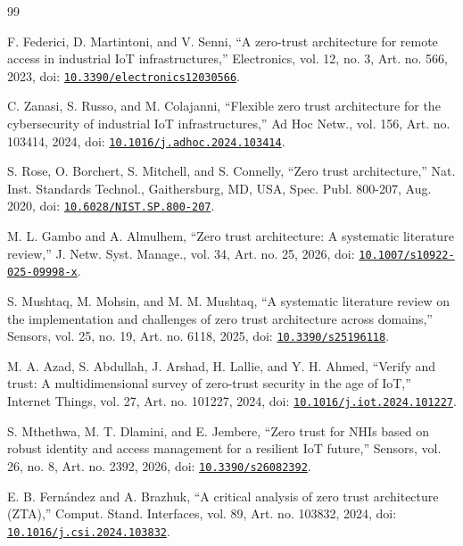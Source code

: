 \documentclass[a4paper,5p,times,twocolumn,number,sort&compress]{elsarticle}
\begin{document}
\begin{thebibliography}{99}
\footnotesize\raggedright\setlength{\itemsep}{0pt}\sloppy

 F. Federici, D. Martintoni, and V. Senni, ``A zero-trust architecture for remote access in industrial IoT infrastructures,'' Electronics, vol. 12, no. 3, Art. no. 566, 2023, doi: \href{https://doi.org/10.3390/electronics12030566}{\nolinkurl{10.3390/electronics12030566}}.

 C. Zanasi, S. Russo, and M. Colajanni, ``Flexible zero trust architecture for the cybersecurity of industrial IoT infrastructures,'' Ad Hoc Netw., vol. 156, Art. no. 103414, 2024, doi: \href{https://doi.org/10.1016/j.adhoc.2024.103414}{\nolinkurl{10.1016/j.adhoc.2024.103414}}.

 S. Rose, O. Borchert, S. Mitchell, and S. Connelly, ``Zero trust architecture,'' Nat. Inst. Standards Technol., Gaithersburg, MD, USA, Spec. Publ. 800-207, Aug. 2020, doi: \href{https://doi.org/10.6028/NIST.SP.800-207}{\nolinkurl{10.6028/NIST.SP.800-207}}.

 M. L. Gambo and A. Almulhem, ``Zero trust architecture: A systematic literature review,'' J. Netw. Syst. Manage., vol. 34, Art. no. 25, 2026, doi: \href{https://doi.org/10.1007/s10922-025-09998-x}{\nolinkurl{10.1007/s10922-025-09998-x}}.

 S. Mushtaq, M. Mohsin, and M. M. Mushtaq, ``A systematic literature review on the implementation and challenges of zero trust architecture across domains,'' Sensors, vol. 25, no. 19, Art. no. 6118, 2025, doi: \href{https://doi.org/10.3390/s25196118}{\nolinkurl{10.3390/s25196118}}.

 M. A. Azad, S. Abdullah, J. Arshad, H. Lallie, and Y. H. Ahmed, ``Verify and trust: A multidimensional survey of zero-trust security in the age of IoT,'' Internet Things, vol. 27, Art. no. 101227, 2024, doi: \href{https://doi.org/10.1016/j.iot.2024.101227}{\nolinkurl{10.1016/j.iot.2024.101227}}.

 S. Mthethwa, M. T. Dlamini, and E. Jembere, ``Zero trust for NHIs based on robust identity and access management for a resilient IoT future,'' Sensors, vol. 26, no. 8, Art. no. 2392, 2026, doi: \href{https://doi.org/10.3390/s26082392}{\nolinkurl{10.3390/s26082392}}.

 E. B. Fern\'andez and A. Brazhuk, ``A critical analysis of zero trust architecture (ZTA),'' Comput. Stand. Interfaces, vol. 89, Art. no. 103832, 2024, doi: \href{https://doi.org/10.1016/j.csi.2024.103832}{\nolinkurl{10.1016/j.csi.2024.103832}}.


\end{thebibliography}
\end{document}
